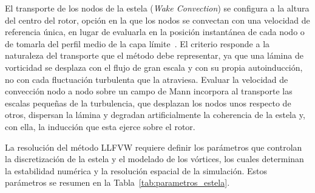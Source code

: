 El transporte de los nodos de la estela (\textit{Wake Convection}) se configura a la altura del centro del rotor, opción en la que los nodos se convectan con una velocidad de referencia única, en lugar de evaluarla en la posición instantánea de cada nodo o de tomarla del perfil medio de la capa límite~\parencite{QBladeDocsAero2024}. El criterio responde a la naturaleza del transporte que el método debe representar, ya que una lámina de vorticidad se desplaza con el flujo de gran escala y con su propia autoinducción, no con cada fluctuación turbulenta que la atraviesa. Evaluar la velocidad de convección nodo a nodo sobre un campo de Mann incorpora al transporte las escalas pequeñas de la turbulencia, que desplazan los nodos unos respecto de otros, dispersan la lámina y degradan artificialmente la coherencia de la estela y, con ella, la inducción que esta ejerce sobre el rotor.

La resolución del método LLFVW requiere definir los parámetros que controlan la discretización de la estela y el modelado de los vórtices, los cuales determinan la estabilidad numérica y la resolución espacial de la simulación. Estos parámetros se resumen en la Tabla~\ref{tab:parametros_estela}.


